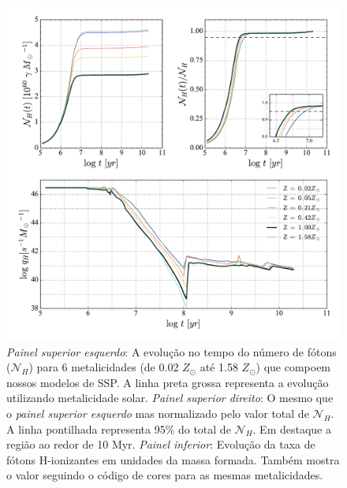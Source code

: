 \begin{figure}
	\includegraphics[scale=0.62]{figuras/Nh_logt_metBase_Padova2000_salp.pdf}
	\caption{\emph{Painel superior esquerdo}: A evolução no tempo do número de fótons ($\mathcal{N}_H$)
para 6 metalicidades (de 0.02 $Z_\odot$ até 1.58 $Z_\odot$) que compoem nossos modelos de SSP.
A linha preta grossa representa a evolução utilizando metalicidade solar. \emph{Painel superior
direito}: O mesmo que o \emph{painel superior esquerdo} mas normalizado pelo valor total de
$\mathcal{N}_H$. A linha pontilhada representa 95\% do total de $\mathcal{N}_H$.
Em destaque a região ao redor de 10 Myr. \emph{Painel inferior}: Evolução da taxa de fótons
H-ionizantes em unidades da massa formada. Também mostra o valor seguindo o código de cores para as
mesmas metalicidades.}
	\label{fig:Nh_qh}
\end{figure}
 
